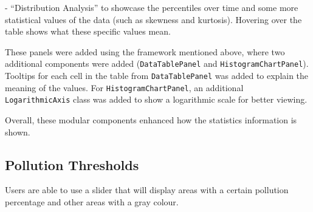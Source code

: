 \documentclass[../main.tex]{subfiles}
\begin{document}
    - “Distribution Analysis” to showcase the percentiles over time and some more statistical values of the data (such as skewness and kurtosis). Hovering over the table shows what these specific values mean.
    
These panels were added using the framework mentioned above, where two additional components were added (\verb|DataTablePanel| and \verb|HistogramChartPanel|). Tooltips for each cell in the table from \verb|DataTablePanel| was added to explain the meaning of the values. For \verb|HistogramChartPanel|, an additional \verb|LogarithmicAxis| class was added to show a logarithmic scale for better viewing.

Overall, these modular components enhanced how the statistics information is shown.

\subsection{Pollution Thresholds}
Users are able to use a slider that will display areas with a certain pollution percentage and other areas with a gray colour.
\end{document}
